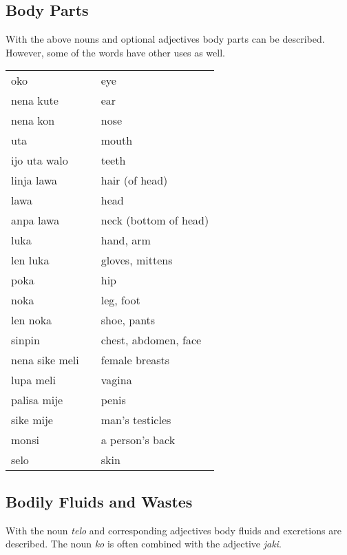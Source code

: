 \newpage

\subsection*{Body Parts}
With the above nouns and optional adjectives body parts can be described.
However, some of the words have other uses as well.

\begin{supertabular}{p{5,5cm}|ll}
    oko            &  & eye                   \\
    nena kute      &  & ear                   \\
    nena kon       &  & nose                  \\
    uta            &  & mouth                 \\
    ijo uta walo   &  & teeth                 \\
    linja lawa     &  & hair (of head)        \\
    lawa           &  & head                  \\
    anpa lawa      &  & neck (bottom of head) \\
    luka           &  & hand, arm             \\
    len luka       &  & gloves, mittens       \\
    poka           &  & hip                   \\
    noka           &  & leg, foot             \\
    len noka       &  & shoe, pants           \\
    sinpin         &  & chest, abdomen, face  \\
    nena sike meli &  & female breasts        \\
    lupa meli      &  & vagina                \\
    palisa mije    &  & penis                 \\
    sike mije      &  & man's testicles       \\
    monsi          &  & a person's back       \\
    selo           &  & skin                  \\
\end{supertabular}

\subsection*{Bodily Fluids and Wastes}
With the noun \textit{telo} and corresponding adjectives body fluids and excretions are described.
The noun \textit{ko} is often combined with the adjective \textit{jaki}.

